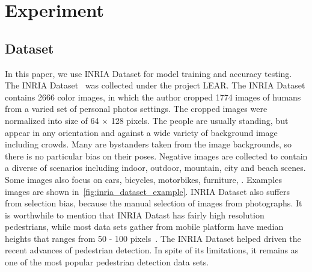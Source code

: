 \section{Experiment}
\label{sec:sec_experiment}

\subsection{Dataset}
In this paper, we use INRIA Dataset for model training and accuracy testing. 
The INRIA Dataset~\cite{2005_CVPR_Dalal} was collected under the project LEAR.
The INRIA Dataset contains 2666 color images, in which the author cropped 1774
images of humans from a varied set of personal photos settings. The cropped
images were normalized into size of 64 $\times$ 128 pixels. The people are
usually standing, but appear in any orientation and against a wide variety of 
background image including crowds. Many are bystanders taken from the image
backgrounds, so there is no particular bias on their poses. Negative images are
collected to contain a diverse of scenarios including indoor, outdoor, mountain,
city and beach scenes. Some images also focus on cars, bicycles, motorbikes,
furniture, \etc.
Examples images are shown in~\fig\ref{fig:inria_dataset_example}.
INRIA Dataset also suffers from selection bias, because the manual selection of
images from photographs. It is worthwhile to mention that INRIA Datast has
fairly high resolution pedestrians, while most data sets gather from mobile
platform have median heights that ranges from 50 - 100
pixels~\cite{2012_PAMI_Dollar}. The INRIA Dataset helped driven the recent
advances of pedestrian detection. In spite of its limitations, it remains as one
of the most popular pedestrian detection data sets. 

